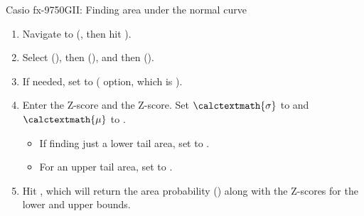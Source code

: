 \begin{onebox}{ Casio fx-9750GII: Finding area under the normal curve}
\begin{enumerate}
\setlength{\itemsep}{0mm}
\item Navigate to  (, then hit ).
\item Select  (), then  (), and then  ().
\item If needed, set  to  ( option, which is ).
\item Enter the  Z-score and the  Z-score. Set $\calctextmath{\sigma}$ to  and $\calctextmath{\mu}$ to .\vspace{-1.5mm}
  \begin{itemize}
  \setlength{\itemsep}{0mm}
  \item If finding just a lower tail area, set  to .
  \item For an upper tail area, set  to .
  \end{itemize}
\item Hit , which will return the area probability () along with the Z-scores for the lower and upper bounds.
\end{enumerate}
\end{onebox}

